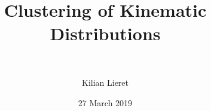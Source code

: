 %
\title{Clustering of Kinematic Distributions}
\subtitle{\ \relax}
\author{Kilian Lieret}
\newcommand*{\coauthors}{}
\date{27 March 2019}
%
%
%